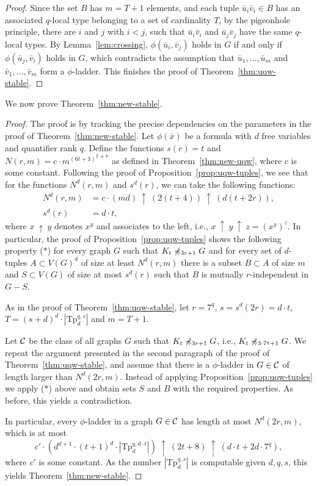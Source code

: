 \begin{proof}
Since the set $B$ has $m=T+1$ elements,
and each tuple $\bar u_i\bar v_i\in B$ has an associated $q$-local type 
belonging to a set of cardinality $T$, 
by the pigeonhole principle, there are $i$ and $j$ 
with $i<j$, such that $\bar u_i\bar v_i$ and $\bar u_j\bar v_j$ 
 have the same $q$-local types. By Lemma~\ref{lem:crossing},   $\phi(\bar u_i,\bar v_j)$ holds in $G$
 if and only if $\phi(\bar u_j,\bar v_i)$ holds in $G$, which contradicts the assumption that $\bar u_1,\ldots,\bar u_m$ and $\bar v_1,\ldots,\bar v_m$ form a $\phi$-ladder.
 This finishes the proof of Theorem~\ref{thm:uqw-stable}.
\end{proof}


We now prove Theorem~\ref{thm:new-stable}.
\begin{proof}
	The proof is by tracking the precise dependencies on the parameters in the proof of Theorem~\ref{thm:new-stable}. 
	Let $\phi(\bar x)$ be a formula with $d$ free variables and quantifier rank $q$.
 Define the functions
	$s(r)=t$ and $N(r,m)=c\cdot {m^{(6t+3)}}^{t+r}$ as defined in Theorem~\ref{thm:new-uqw},
	where $c$ is some constant. 
	Following the proof of Proposition~\ref{prop:uqw-tuples}, we see that for the functions $N^d(r,m)$ and $s^d(r)$, we can take the following functions:%
		\newcommand{\pow}{\ \uparrow\ }%
	\begin{align*}
	 N^d(r,m)&= c\cdot (m d)\pow(2(t+4))\pow(d(t+2r)),\\
	  s^d(r)&= d\cdot t,
	\end{align*}
where $x\pow y$ denotes $x^y$ and associates to the left, i.e., $x\pow y\pow z=(x^y)^z$.
In particular, the proof of Proposition~\ref{prop:uqw-tuples} shows the following property
($\ast$)
for every graph $G$ such that $K_t\not\minor_{3r+1} G$ 
and for every set of $d$-tuples $A\subset V(G)^d$ of size at least $N^d(r,m)$
there is a subset $B\subset A$ of size $m$ and $S\subset V(G)$ of size at most $s^d(r)$
such that $B$ is mutually $r$-independent in $G-S$.

	
As in the proof of Theorem~\ref{thm:uqw-stable}, let $r=7^q$,  
$s=s^d(2r)=d\cdot t$,  $T=(s+d)^d\cdot |\mathrm{Tp}_d^{q,s}|$ and $m=T+1$.



Let $\cal C$ be the class of all graphs $G$
such that $K_t\not\minor_{3r+1} G$, i.e., $K_t\not\minor_{3\cdot 7^q+1} G$. We repeat the argument presented in the second paragraph of the proof of Theorem~\ref{thm:uqw-stable}, and assume that there is a $\phi$-ladder in $G\in \cal C$ of length larger than $N^d(2r,m)$.
 Instead of applying Proposition~\ref{prop:uqw-tuples} we apply  ($\ast$) above
and obtain sets  $S$ and $B$ with the required properties. As before, this yields a contradiction. 


In particular, every $\phi$-ladder in a graph $G\in \cal C$ has length at most $N^d(2r,m)$, 
which is at most $$c'\cdot (d^{d+1}\cdot (t+1)^d\cdot |\mathrm{Tp}_d^{q,d\cdot t}|)\pow(2t+8)\pow(d\cdot t+2d\cdot 7^q),$$
where $c'$ is some constant.
As the number $|\mathrm{Tp}_d^{q,s}|$ is computable given $d,q,s$, this 
 yields Theorem~\ref{thm:new-stable}.
\end{proof}

